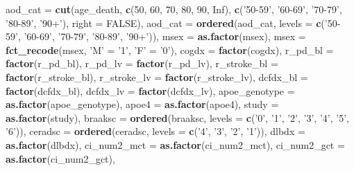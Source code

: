 \documentclass[]{book}
\newenvironment{Shaded}{\begin{snugshade}}{\end{snugshade}}
\newcommand{\DataTypeTok}[1]{\textcolor[rgb]{0.13,0.29,0.53}{#1}}
\newcommand{\DecValTok}[1]{\textcolor[rgb]{0.00,0.00,0.81}{#1}}
\newcommand{\KeywordTok}[1]{\textcolor[rgb]{0.13,0.29,0.53}{\textbf{#1}}}
\newcommand{\NormalTok}[1]{#1}
\newcommand{\OtherTok}[1]{\textcolor[rgb]{0.56,0.35,0.01}{#1}}
\newcommand{\StringTok}[1]{\textcolor[rgb]{0.31,0.60,0.02}{#1}}
\begin{document}
\begin{Shaded}
\begin{Highlighting}[]
{{{{{{{{{{{{{{{{{{{{{{        \DataTypeTok{aod_cat =} \KeywordTok{cut}\NormalTok{(age_death, }\KeywordTok{c}\NormalTok{(}\DecValTok{50}\NormalTok{, }\DecValTok{60}\NormalTok{, }\DecValTok{70}\NormalTok{, }\DecValTok{80}\NormalTok{, }\DecValTok{90}\NormalTok{, }\OtherTok{Inf}\NormalTok{), }\KeywordTok{c}\NormalTok{(}\StringTok{'50-59'}\NormalTok{, }\StringTok{'60-69'}\NormalTok{, }\StringTok{'70-79'}\NormalTok{, }\StringTok{'80-89'}\NormalTok{, }\StringTok{'90+'}\NormalTok{), }\DataTypeTok{right =} \OtherTok{FALSE}\NormalTok{),}
        \DataTypeTok{aod_cat =} \KeywordTok{ordered}\NormalTok{(aod_cat, }\DataTypeTok{levels =} \KeywordTok{c}\NormalTok{(}\StringTok{'50-59'}\NormalTok{, }\StringTok{'60-69'}\NormalTok{, }\StringTok{'70-79'}\NormalTok{, }\StringTok{'80-89'}\NormalTok{, }\StringTok{'90+'}\NormalTok{)), }
        \DataTypeTok{msex =} \KeywordTok{as.factor}\NormalTok{(msex), }
        \DataTypeTok{msex =} \KeywordTok{fct_recode}\NormalTok{(msex, }\StringTok{'M'}\NormalTok{ =}\StringTok{ '1'}\NormalTok{, }\StringTok{'F'}\NormalTok{ =}\StringTok{ '0'}\NormalTok{),}
        \DataTypeTok{cogdx =} \KeywordTok{factor}\NormalTok{(cogdx), }
        \DataTypeTok{r_pd_bl =} \KeywordTok{factor}\NormalTok{(r_pd_bl), }
        \DataTypeTok{r_pd_lv =} \KeywordTok{factor}\NormalTok{(r_pd_lv), }
        \DataTypeTok{r_stroke_bl =} \KeywordTok{factor}\NormalTok{(r_stroke_bl), }
        \DataTypeTok{r_stroke_lv =} \KeywordTok{factor}\NormalTok{(r_stroke_lv), }
        \DataTypeTok{dcfdx_bl =} \KeywordTok{factor}\NormalTok{(dcfdx_bl),}
        \DataTypeTok{dcfdx_lv =} \KeywordTok{factor}\NormalTok{(dcfdx_lv),}
        \DataTypeTok{apoe_genotype =} \KeywordTok{as.factor}\NormalTok{(apoe_genotype), }
        \DataTypeTok{apoe4 =} \KeywordTok{as.factor}\NormalTok{(apoe4), }
        \DataTypeTok{study =} \KeywordTok{as.factor}\NormalTok{(study), }
        \DataTypeTok{braaksc =} \KeywordTok{ordered}\NormalTok{(braaksc, }\DataTypeTok{levels =} \KeywordTok{c}\NormalTok{(}\StringTok{'0'}\NormalTok{, }\StringTok{'1'}\NormalTok{, }\StringTok{'2'}\NormalTok{, }\StringTok{'3'}\NormalTok{, }\StringTok{'4'}\NormalTok{, }\StringTok{'5'}\NormalTok{, }\StringTok{'6'}\NormalTok{)), }
        \DataTypeTok{ceradsc =} \KeywordTok{ordered}\NormalTok{(ceradsc, }\DataTypeTok{levels =} \KeywordTok{c}\NormalTok{(}\StringTok{'4'}\NormalTok{, }\StringTok{'3'}\NormalTok{, }\StringTok{'2'}\NormalTok{, }\StringTok{'1'}\NormalTok{)), }
        \DataTypeTok{dlbdx =} \KeywordTok{as.factor}\NormalTok{(dlbdx), }
        \DataTypeTok{ci_num2_mct =} \KeywordTok{as.factor}\NormalTok{(ci_num2_mct), }
        \DataTypeTok{ci_num2_gct =} \KeywordTok{as.factor}\NormalTok{(ci_num2_gct), }
}}}}}}}}}}}}}}}}}}}}}}
\end{Highlighting}
\end{Shaded}
\end{document}
